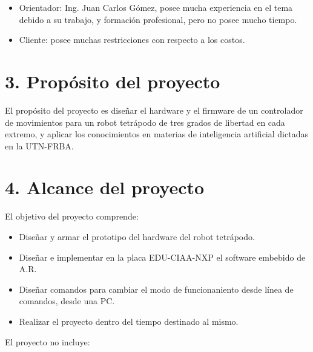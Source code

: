 \documentclass[
11pt, %
codirector, %
]{charter}
\begin{document}
\begin{itemize}
\item Orientador: Ing. Juan Carlos Gómez, posee mucha experiencia en el tema debido a su trabajo, y formación  profesional, pero no posee mucho tiempo.
\item Cliente: posee muchas restricciones con respecto a los costos.
\end{itemize}


\section{3. Propósito del proyecto}
\label{sec:proposito}

El propósito del proyecto es diseñar el hardware y el firmware de un controlador de movimientos para un robot tetrápodo de tres grados de libertad en cada extremo, y aplicar los conocimientos en materias de inteligencia artificial dictadas en la UTN-FRBA.


\section{4. Alcance del proyecto}
\label{sec:alcance}

El objetivo del proyecto comprende:

\begin{itemize}
\item Diseñar y armar el prototipo del hardware del robot tetrápodo.
\item Diseñar e implementar en la placa EDU-CIAA-NXP el software embebido de A.R.
\item Diseñar comandos para cambiar el modo de funcionaniento desde línea de comandos, desde una PC. 
\item Realizar el proyecto dentro del tiempo destinado al mismo.
\end{itemize}

El proyecto no incluye:
\end{document}
